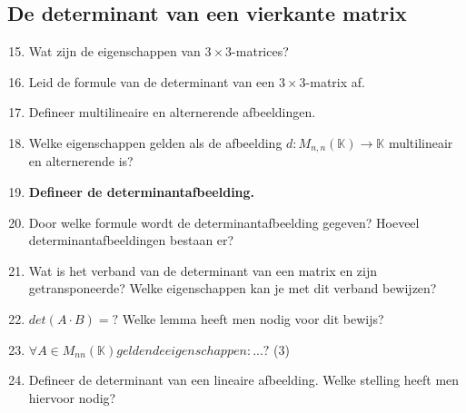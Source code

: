 \documentclass[12pt]{article}
\begin{document}
    \subsection{De determinant van een vierkante matrix}
    \begin{enumerate}
        \setcounter{enumi}{14}
        \item Wat zijn de eigenschappen van $3\times 3$-matrices?
        \item Leid de formule van de determinant van een $3 \times 3$-matrix af.
        \item Defineer multilineaire en alternerende afbeeldingen.
        \item Welke eigenschappen gelden als de afbeelding $d:M_{n,n}(\mathbb{K})\rightarrow \mathbb{K}$ multilineair en alternerende is?
        \item \textbf{Defineer de determinantafbeelding.}
        \item Door welke formule wordt de determinantafbeelding gegeven? Hoeveel determinantafbeeldingen bestaan er?
        \item Wat is het verband van de determinant van een matrix en zijn getransponeerde? Welke eigenschappen kan je met dit verband bewijzen?
        \item $det(A\cdot B)= ?$ Welke lemma heeft men nodig voor dit bewijs?
        \item $\forall A \in M_{nn}(\mathbb{K}) gelden de eigenschappen: ... ?$ (3)
        \item Defineer de determinant van een lineaire afbeelding. Welke stelling heeft men hiervoor nodig?
    \end{enumerate}
\end{document}
